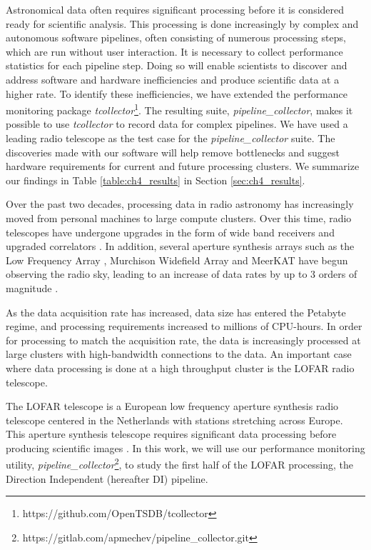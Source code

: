Astronomical data often requires significant processing before it is considered ready for scientific analysis. This processing is done increasingly by complex and autonomous software pipelines, often consisting of numerous processing steps, which are run without user interaction. It is necessary to collect performance statistics for each pipeline step. Doing so will enable scientists to discover and address software and hardware inefficiencies and produce scientific data at a higher rate. To identify these inefficiencies, we have extended the performance monitoring package \textit{tcollector}\footnote{https://github.com/OpenTSDB/tcollector}\citep{tcollector}. The resulting suite, \textit{pipeline\_collector}, makes it possible to use \textit{tcollector} to record data for complex pipelines. We have used a leading radio telescope as the test case for the \textit{pipeline\_collector} suite. The discoveries made with our software will help remove bottlenecks and suggest hardware requirements for current and future processing clusters. We summarize our findings in Table \ref{table:ch4_results} in Section \ref{sec:ch4_results}.

Over the past two decades, processing data in radio astronomy has increasingly moved from personal machines to large compute clusters. Over this time, radio telescopes have undergone upgrades in the form of wide band receivers and upgraded correlators \citep{lofarcobalt,gmrt_upgrade}. In addition, several aperture synthesis arrays such as the Low Frequency Array \citep[LOFAR,][]{LOFAR}, Murchison Widefield Array \citep[MWA][]{MWA,mwa2} and MeerKAT \citep{meerkat} have begun observing the radio sky, leading to an increase of data rates by up to 3 orders of magnitude \citep{mwa_data_size,meerkat_size}.

As the data acquisition rate has increased, data size has entered the Petabyte regime, and processing requirements increased to millions of CPU-hours. In order for processing to match the acquisition rate, the data is increasingly processed at large clusters with high-bandwidth connections to the data. An important case where data processing is done at a high throughput cluster is the LOFAR radio telescope.

The LOFAR telescope is a European low frequency aperture synthesis radio telescope centered in the Netherlands with stations stretching across Europe. This aperture synthesis telescope requires significant data processing before producing scientific images \citep{lofar_prefactor,Wendy_bootes,tassesmirnov,oonk_2014}. In this work, we will use our performance monitoring utility, \textit{pipeline\_collector}\footnote{https://gitlab.com/apmechev/pipeline\_collector.git}, to study the first half of the LOFAR processing, the Direction Independent (hereafter  DI) pipeline. 

